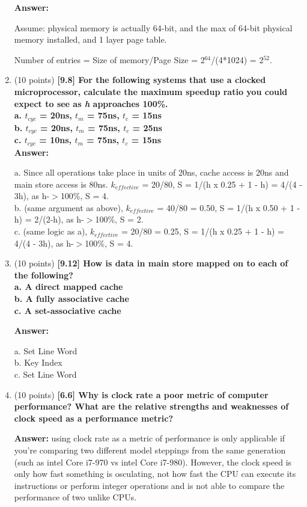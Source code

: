 \documentclass[letterpaper,10pt,onecolumn,titlepage]{article}
\begin{document}
\begin{enumerate}
\textbf{Answer:} 

Assume: physical memory is actually 64-bit, and the max of 64-bit physical memory installed, and 1 layer page table.

Number of entries = Size of memory/Page Size = 2$^{64}$/(4*1024) = 2$^{52}$.

\item (10 points) \textbf{[9.8] For the following systems that use a clocked microprocessor, calculate the maximum speedup ratio you could expect to see as \textit{h} approaches 100\%.\\
a. $t_{cyc}$ = 20ns, $t_m$ = 75ns, $t_c$ = 15ns\\
b. $t_{cyc}$ = 20ns, $t_m$ = 75ns, $t_c$ = 25ns\\
c. $t_{cyc}$ = 10ns, $t_m$ = 75ns, $t_c$ = 15ns}\\

\textbf{Answer:} 

a. Since all operations take place in units of 20ns, cache access is 20ns and main store access is 80ns. 
$k_{effective}$ = 20/80, S = 1/(h x 0.25 + 1 - h) = 4/(4 - 3h), as h-$>$100\%, S = 4.\\
b. (same argument as above), $k_{effective}$ = 40/80 = 0.50, S = 1/(h x 0.50 + 1 - h) = 2/(2-h), as h-$>$100\%, S = 2.\\
c. (same logic as a), $k_{effective}$ = 20/80 = 0.25, S = 1/(h x 0.25 + 1 - h) = 4/(4 - 3h), as h-$>$100\%, S = 4.

\item (10 points) \textbf{[9.12] How is data in main store mapped on to each of the following?\\
a. A direct mapped cache\\
b. A fully associative cache\\
c. A set-associative cache}

\textbf{Answer:} 

a. Set Line Word\\
b. Key Index\\
c. Set Line Word

\item (10 points) \textbf{[6.6] Why is clock rate a poor metric of computer performance? What are the relative strengths and weaknesses of clock speed as a performance metric?}

\textbf{Answer:} using clock rate as a metric of performance is only applicable if you're comparing two different model steppings from the same generation (such as intel Core i7-970 vs intel Core i7-980). However, the clock speed is only how fast something is osculating, not how fast the CPU can execute its instructions or perform integer operations and is not able to compare the performance of two unlike CPUs.


\end{enumerate}
\end{document}
